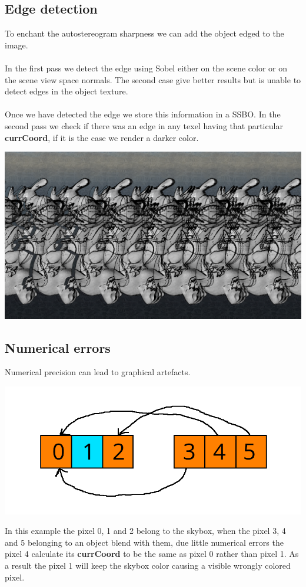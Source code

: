 \documentclass[12pt, a4paper]{article}
\begin{document}
\subsection{Edge detection}
To enchant the autostereogram sharpness we can add the object edged to the image.\\\\
In the first pass we detect the edge using Sobel either on the scene color or on the scene view space normals. The second case give better results 
but is unable to detect edges in the object texture.\\\\
Once we have detected the edge we store this information in a SSBO. In the second pass we check if there was an edge in any texel having
that particular \textbf{currCoord}, if it is the case we render a darker color.
\begin{center}
    \centering
    \includegraphics[width=1.0\textwidth]{img/edge.png}
\end{center}

\subsection{Numerical errors}
Numerical precision can lead to graphical artefacts.
\begin{center}
    \centering
    \includegraphics[width=1.0\textwidth]{img/pixel.png}
\end{center}
In this example the pixel 0, 1 and 2 belong to the skybox, when
the pixel 3, 4 and 5 belonging to an object blend with them, due little numerical
errors the pixel 4 calculate its \textbf{currCoord} to be the same as pixel 0 rather
than pixel 1. As a result the pixel 1 will keep the skybox color causing a visible
wrongly colored pixel.
\end{document}
